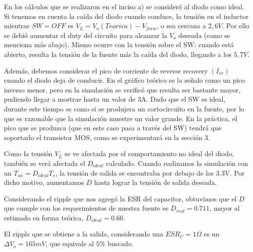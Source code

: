 \documentclass[e4_tp1_main.tex]{subfiles}
\begin{document}
En los c\'alculos que se realizaron en el inciso a) se consider\'o al diodo como ideal. Si tenemos en cuenta la ca\'ida del diodo cuando conduce, la tensi\'on en el inductor mientras $SW=OFF$ es $V_{L}=V_o(Teorica)-V_{forw}$, o sea cercana a $2,6V$. Por ello se debió aumentar el duty del circuito para alcanzar la $V_o$ deseada (como se menciona más abajo). Mismo ocurre con la tensión sobre el SW: cuando está abierto, resulta la tensión de la fuente más la caída del diodo, llegando a los $5,7V$.\par 
Adem\'as, debemos considerar el pico de corriente de reverse recovery $(I_{rr})$ cuando el diodo deja de conducir. En el gráfico teórico se la señalo como un pico inverso menor, pero en la simulación se verificó que resulta ser bastante mayor, pudiendo llegar a mostrae hasta un valor de 3A. Dado que el SW es ideal, durante este tiempo es como si se produjera un cortocircuito en la fuente, por lo que es razonable que la simulación muestre un valor grande. En la práctica, el pico que se produzca (que en este caso pasa a través del SW) tendrá que soportarlo el transistor MOS, como se experimentará en la sección 3. 



Como la tensi\'on $V_L$ se ve afectada por el comportamiento no ideal del diodo, tambi\'en se ver\'a afectada el $D_{ideal}$ calculado.
Cuando realizamos la simulaci\'on con un $T_{on}=D_{ideal}T_s$, la tensi\'on de salida se encontraba por debajo de los 3.3V. Por dicho motivo, aumentamos $D$ hasta lograr la tensi\'on de salida deseada. 

Considerando el ripple que nos agreg\'o la ESR del capacitor, obtuvimos que el $D$ que cumple con los requerimientos de nuestra fuente es $D_{real}=0.711$, mayor al estimado en forma teórica, $D_{ideal} = 0.66$.

El ripple que se obtiene a la salida, considerando una $ESR_C=1\Omega$ es un $\Delta V_o = 165mV$, que equivale al $5\%$ buscado.






\newpage
\end{document}
